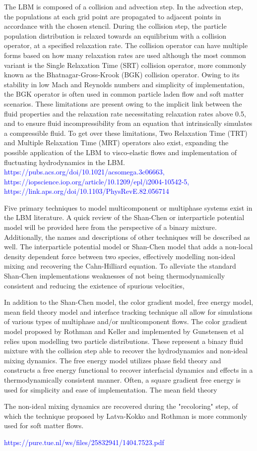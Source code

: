 The LBM is composed of a collision and advection step. In the advection step, the populations at each grid point are propagated to adjacent points in accordance with the chosen stencil. During the collision step, the particle population distribution is relaxed towards an equilibrium with a collision operator, at a specified relaxation rate. The collision operator can have multiple forms based on how many relaxation rates are used although the most common variant is the Single Relaxation Time (SRT) collision operator, more commonly known as the Bhatnagar-Gross-Krook (BGK) collision operator. Owing to its stability in low Mach and Reynolds numbers and simplicity of implementation, the BGK operator is often used in common particle laden flow and soft matter scenarios. \cite{bhatnagar_model_1954} These limitations are present owing to the implicit link between the fluid properties and the relaxation rate necessitating relaxation rates above 0.5, and to ensure fluid incompressibility from an equation that intrinsically simulates a compressible fluid. To get over these limitations, Two Relaxation Time (TRT) and Multiple Relaxation Time (MRT) operators also exist, expanding the possible application of the LBM to visco-elastic flows and implementation of fluctuating hydrodynamics in the LBM. \textcolor{blue}{https://pubs.acs.org/doi/10.1021/acsomega.3c06663, https://iopscience.iop.org/article/10.1209/epl/i2004-10542-5, https://link.aps.org/doi/10.1103/PhysRevE.82.056714}

Five primary techniques to model multicomponent or multiphase systems exist in the LBM literature. A quick review of the Shan-Chen or interparticle potential model  will be provided here from the perspective of a binary mixture. Additionally, the names and descriptions of other techniques will be described as well. The interparticle potential model or Shan-Chen model that adds a non-local density dependent force between two species, effectively modelling non-ideal mixing and recovering the Cahn-Hilliard equation. To alleviate the standard Shan-Chen implementations weaknesses of not being thermodynamically consistent and reducing the existence of spurious velocities, 

In addition to the Shan-Chen model, the color gradient model, free energy model, mean field theory model and interface tracking technique all allow for simulations of various types of multiphase and/or multicomponent flows. The color gradient model proposed by Rothman and Keller and implemented by Gunstensen et al relies upon modelling two particle distributions. These represent a binary fluid mixture with the collision step able to recover the hydrodynamics and non-ideal mixing dynamics. The free energy model utilizes phase field theory and constructs a free energy functional to recover interfacial dynamics and effects in a thermodynamically consistent manner. Often, a square gradient free energy is used for simplicity and ease of implementation. The mean field theory 

The non-ideal mixing dynamics are recovered during the "recoloring" step, of which the technique proposed by Latva-Kokko and Rothman is more commonly used for soft matter flows.

\textcolor{blue}{https://pure.tue.nl/ws/files/25832941/1404.7523.pdf}